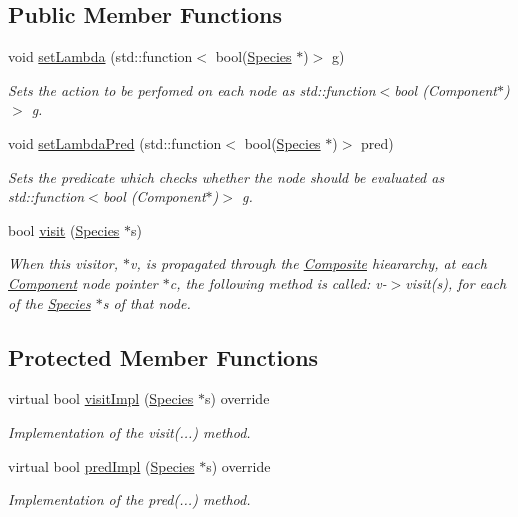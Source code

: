 \subsection*{Public Member Functions}
\begin{DoxyCompactItemize}
\item 
void \hyperlink{classSpeciesVisitorLambda_a09d2fbe0f3aec217fb587b7a4ad26733}{set\+Lambda} (std\+::function$<$ bool(\hyperlink{classSpecies}{Species} $\ast$)$>$ g)
\begin{DoxyCompactList}\small\item\em Sets the action to be perfomed on each node as std\+::function$<$bool (\+Component$\ast$)$>$ g. \end{DoxyCompactList}\item 
void \hyperlink{classSpeciesVisitorLambda_a9e47f21aa9709e39065e8f393ed094c5}{set\+Lambda\+Pred} (std\+::function$<$ bool(\hyperlink{classSpecies}{Species} $\ast$)$>$ pred)
\begin{DoxyCompactList}\small\item\em Sets the predicate which checks whether the node should be evaluated as std\+::function$<$bool (\+Component$\ast$)$>$ g. \end{DoxyCompactList}\item 
bool \hyperlink{classSpeciesVisitor_a1a3573d237d36307cc35e123e67875db}{visit} (\hyperlink{classSpecies}{Species} $\ast$s)
\begin{DoxyCompactList}\small\item\em When this visitor, $\ast$v, is propagated through the \hyperlink{classComposite}{Composite} hieararchy, at each \hyperlink{classComponent}{Component} node pointer $\ast$c, the following method is called\+: v-\/$>$visit(s), for each of the \hyperlink{classSpecies}{Species} $\ast$s of that node. \end{DoxyCompactList}\end{DoxyCompactItemize}
\subsection*{Protected Member Functions}
\begin{DoxyCompactItemize}
\item 
virtual bool \hyperlink{classSpeciesVisitorLambda_aa98d74ce907a46e8f7ad1ce25d5445fe}{visit\+Impl} (\hyperlink{classSpecies}{Species} $\ast$s) override
\begin{DoxyCompactList}\small\item\em Implementation of the visit(...) method. \end{DoxyCompactList}\item 
virtual bool \hyperlink{classSpeciesVisitorLambda_addaad814d443e92eff749acae08f9e3d}{pred\+Impl} (\hyperlink{classSpecies}{Species} $\ast$s) override
\begin{DoxyCompactList}\small\item\em Implementation of the pred(...) method. \end{DoxyCompactList}\end{DoxyCompactItemize}
